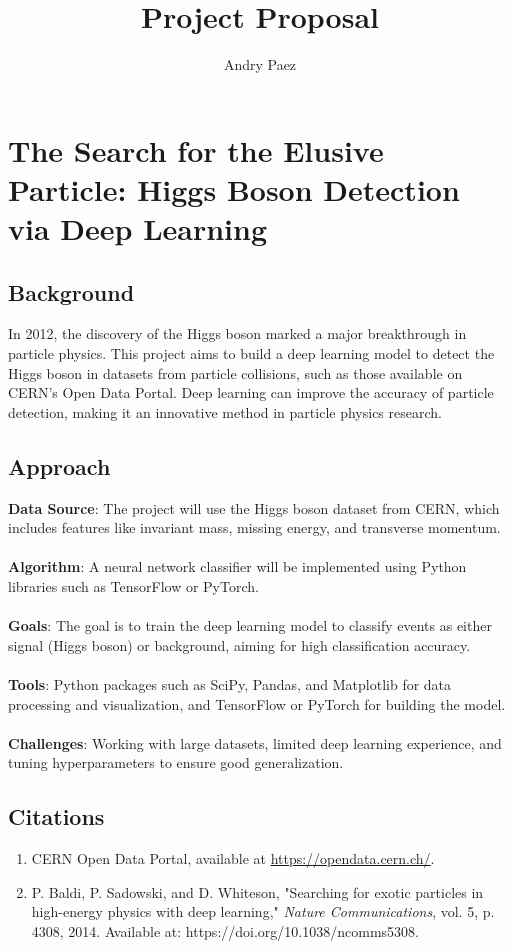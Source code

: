 \documentclass{article}
\begin{document}
\title{\textbf{Project Proposal}}
\author{Andry Paez}
\date{}
\maketitle

\section{The Search for the Elusive Particle: Higgs Boson Detection via Deep Learning}

\subsection{Background} In 2012, the discovery of the Higgs boson marked a major breakthrough in particle physics. This project aims to build a deep learning model to detect the Higgs boson in datasets from particle collisions, such as those available on CERN's Open Data Portal. Deep learning can improve the accuracy of particle detection, making it an innovative method in particle physics research.

\subsection{Approach}

\textbf{Data Source}: The project will use the Higgs boson dataset from CERN, which includes features like invariant mass, missing energy, and transverse momentum.\\\\
\textbf{Algorithm}: A neural network classifier will be implemented using Python libraries such as TensorFlow or PyTorch.\\\\
\textbf{Goals}: The goal is to train the deep learning model to classify events as either signal (Higgs boson) or background, aiming for high classification accuracy.\\\\
\textbf{Tools}: Python packages such as SciPy, Pandas, and Matplotlib for data processing and visualization, and TensorFlow or PyTorch for building the model.\\\\
\textbf{Challenges}: Working with large datasets, limited deep learning experience, and tuning hyperparameters to ensure good generalization.

\subsection{Citations} 
    \begin{enumerate} 
        \item CERN Open Data Portal, available at \url{https://opendata.cern.ch/}.
        \item P. Baldi, P. Sadowski, and D. Whiteson, "Searching for exotic particles in high-energy physics with deep learning," \textit{Nature Communications}, vol. 5, p. 4308, 2014. Available at: https://doi.org/10.1038/ncomms5308.
    \end{enumerate}
\end{document}
